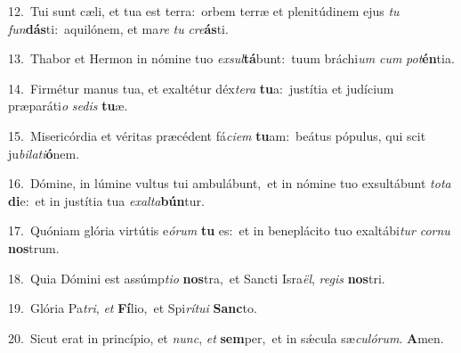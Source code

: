 {\numbfont\textcolor{\numbcolor}{12.}}~Tui sunt cæli, et tua est terra:~\dagger orbem terræ et plenitúdinem ejus \textit{tu} \textit{fun}\-\textbf{dás}ti:~\star aquilónem, et ma\textit{re} \textit{tu} \textit{cre}\-\textbf{ás}ti.\par
{\numbfont\textcolor{\numbcolor}{13.}}~Thabor et Hermon in nómine tuo \textit{ex}\-\textit{sul}\textbf{tá}bunt:~\star tuum bráchi\textit{um} \textit{cum} \textit{pot}\-\textbf{én}tia.\par
{\numbfont\textcolor{\numbcolor}{14.}}~Firmétur manus tua, et exaltétur déx\-\textit{te}\-\textit{ra} \textbf{tu}\-a:~\star justítia et judícium præparáti\textit{o} \textit{se}\-\textit{dis} \textbf{tu}\-æ.\par
{\numbfont\textcolor{\numbcolor}{15.}}~Misericórdia et véritas præcédent fá\-\textit{ci}\-\textit{em} \textbf{tu}\-am:~\star beátus pópulus, qui scit ju\-\textit{bi}\-\textit{la}\textit{ti}\textbf{ó}nem.\par
{\numbfont\textcolor{\numbcolor}{16.}}~Dómine, in lúmine vultus tui ambulábunt,~\dagger et in nómine tuo exsultábunt \textit{to}\-\textit{ta} \textbf{di}\-e:~\star et in justítia tua \textit{ex}\-\textit{al}\textit{ta}\textbf{bún}tur.\par
{\numbfont\textcolor{\numbcolor}{17.}}~Quóniam glória virtútis e\-\textit{ó}\-\textit{rum} \textbf{tu} es:~\star et in beneplácito tuo exaltábi\textit{tur} \textit{cor}\-\textit{nu} \textbf{nos}\-trum.\par
{\numbfont\textcolor{\numbcolor}{18.}}~Quia Dómini est assúmp\-\textit{ti}\-\textit{o} \textbf{nos}\-tra,~\star et Sancti Isra\-\textit{ël}\-, \textit{re}\-\textit{gis} \textbf{nos}\-tri.\par
{\numbfont\textcolor{\numbcolor}{19.}}~Glória Pa\-\textit{tri}\-, \textit{et} \textbf{Fí}\-lio,~\star et Spi\-\textit{rí}\-\textit{tu}\textit{i} \textbf{Sanc}\-to.\par
{\numbfont\textcolor{\numbcolor}{20.}}~Sicut erat in princípio, et \textit{nunc}\-, \textit{et} \textbf{sem}\-per,~\star et in sǽcula sæ\-\textit{cu}\-\textit{ló}\textit{rum}. \textbf{A}\-men.\par
